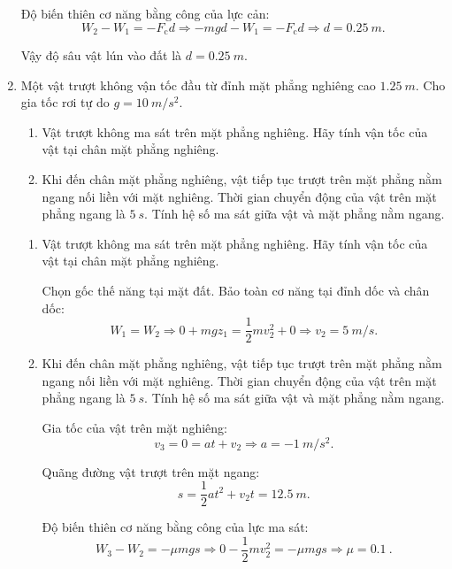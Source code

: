 \begin{enumerate}[label=\bfseries Câu \arabic*:, leftmargin=1.5cm]
{		Độ biến thiên cơ năng bằng công của lực cản:
		$$W_2 - W_1 = -F_\text{c} d \Rightarrow -mgd - W_1 = -F_\text{c} d \Rightarrow d = \SI{0.25}{m}.$$
		
		Vậy độ sâu vật lún vào đất là $d=\SI{0.25}{m}$.
	}
	\item {}
	
	
	{
		Một vật trượt không vận tốc đầu từ đỉnh mặt phẳng nghiêng cao $\SI{1.25}{m}$. Cho gia tốc rơi tự do $g=\SI{10}{m/s^2}$.
		\begin{enumerate}[label=\alph*)]
			\item Vật trượt không ma sát trên mặt phẳng nghiêng. Hãy tính vận tốc của vật tại chân mặt phẳng nghiêng.
			\item Khi đến chân mặt phẳng nghiêng, vật tiếp tục trượt trên mặt phẳng nằm ngang nối liền với mặt nghiêng. Thời gian chuyển động của vật trên mặt phẳng ngang là $\SI{5}{s}$. Tính hệ số ma sát giữa vật và mặt phẳng nằm ngang.
		\end{enumerate}
	}
	
	\hideall
	{	
		\begin{enumerate}[label=\alph*)]
			\item Vật trượt không ma sát trên mặt phẳng nghiêng. Hãy tính vận tốc của vật tại chân mặt phẳng nghiêng.
			
			Chọn gốc thế năng tại mặt đất. Bảo toàn cơ năng tại đỉnh dốc và chân dốc:
			$$W_1 = W_2 \Rightarrow 0 + mgz_1 = \dfrac{1}{2}mv_2^2 + 0 \Rightarrow v_2 = \SI{5}{m/s}.$$
			
			\item Khi đến chân mặt phẳng nghiêng, vật tiếp tục trượt trên mặt phẳng nằm ngang nối liền với mặt nghiêng. Thời gian chuyển động của vật trên mặt phẳng ngang là $\SI{5}{s}$. Tính hệ số ma sát giữa vật và mặt phẳng nằm ngang.
			
			Gia tốc của vật trên mặt nghiêng:
			$$v_3 = 0 = at + v_2 \Rightarrow a = \SI{-1}{m/s^2}.$$
			
			Quãng đường vật trượt trên mặt ngang:
			$$s=\dfrac{1}{2}at^2 + v_2 t = \SI{12.5}{m}.$$
			
			Độ biến thiên cơ năng bằng công của lực ma sát:
			$$W_3 - W_2 = -\mu mg s \Rightarrow 0 - \dfrac{1}{2}mv_2^2 = -\mu mg s \Rightarrow \mu = \SI{0.1}{}.$$	
			
		\end{enumerate}
	}

\end{enumerate}